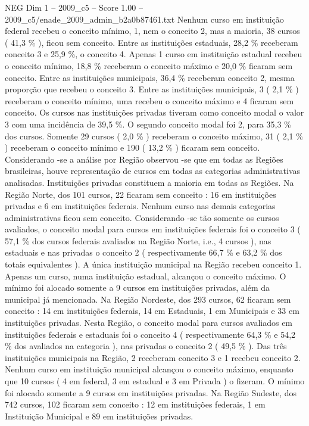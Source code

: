 \begin{textsample}{NEG Dim 1 – 2009\_c5 – Score 1.00 – 2009\_c5/enade\_2009\_admin\_b2a0b87461.txt}
Nenhum curso em instituição federal recebeu o conceito mínimo, 1, nem o conceito 2, mas a maioria, 38 cursos ( 41,3 \% ), ficou sem conceito.
Entre as instituições estaduais, 28,2 \% receberam conceito 3 e 25,9 \%, o conceito 4.
Apenas 1 curso em instituição estadual recebeu o conceito mínimo, 18,8 \% receberam o conceito máximo e 20,0 \% ficaram sem conceito.
Entre as instituições municipais, 36,4 \% receberam conceito 2, mesma proporção que recebeu o conceito 3.
Entre as instituições municipais, 3 ( 2,1 \% ) receberam o conceito mínimo, uma recebeu o conceito máximo e 4 ficaram sem conceito.
Os cursos nas instituições privadas tiveram como conceito modal o valor 3 com uma incidência de 39,5 \%.
O segundo conceito modal foi 2, para 35,3 \% dos cursos.
Somente 29 cursos ( 2,0 \% ) receberam o conceito máximo, 31 ( 2,1 \% ) receberam o conceito mínimo e 190 ( 13,2 \% ) ficaram sem conceito.
Considerando -se a análise por Região observou -se que em todas as Regiões brasileiras, houve representação de cursos em todas as categorias administrativas analisadas.
Instituições privadas constituem a maioria em todas as Regiões.
Na Região Norte, dos 101 cursos, 22 ficaram sem conceito : 16 em instituições privadas e 6 em instituições federais.
Nenhum curso nas demais categorias administrativas ficou sem conceito.
Considerando -se tão somente os cursos avaliados, o conceito modal para cursos em instituições federais foi o conceito 3 ( 57,1 \% dos cursos federais avaliados na Região Norte, i.e., 4 cursos ), nas estaduais e nas privadas o conceito 2 ( respectivamente 66,7 \% e 63,2 \% dos totais equivalentes ).
A única instituição municipal na Região recebeu conceito 1.
Apenas um curso, numa instituição estadual, alcançou o conceito máximo.
O mínimo foi alocado somente a 9 cursos em instituições privadas, além da municipal já mencionada.
Na Região Nordeste, dos 293 cursos, 62 ficaram sem conceito : 14 em instituições federais, 14 em Estaduais, 1 em Municipais e 33 em instituições privadas.
Nesta Região, o conceito modal para cursos avaliados em instituições federais e estaduais foi o conceito 4 ( respectivamente 64,3 \% e 54,2 \% dos avaliados na categoria ), nas privadas o conceito 2 ( 49,5 \% ).
Das três instituições municipais na Região, 2 receberam conceito 3 e 1 recebeu conceito 2.
Nenhum curso em instituição municipal alcançou o conceito máximo, enquanto que 10 cursos ( 4 em federal, 3 em estadual e 3 em Privada ) o fizeram.
O mínimo foi alocado somente a 9 cursos em instituições privadas.
Na Região Sudeste, dos 742 cursos, 102 ficaram sem conceito : 12 em instituições federais, 1 em Instituição Municipal e 89 em instituições privadas.

\end{textsample}
